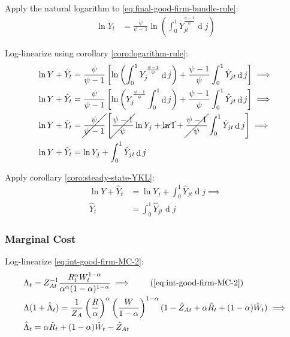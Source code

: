 \documentclass[
	12pt,
	]{article}
\numberwithin{equation}{section}
\DeclareMathOperator{\dif}{d}
\theoremstyle{definition}
\theoremstyle{plain}
\theoremstyle{plain}
\theoremstyle{plain}
\begin{document}
Apply the natural logarithm to \ref{eq:final-good-firm-bundle-rule}:
\begin{align}
	\ln Y_t &= \frac{\psi}{\psi-1} \ln \left( \int_{0}^{1} Y_{jt}^{\frac{\psi-1}{\psi}} \dif j \right) \nonumber
\end{align}

Log-linearize using corollary \ref{coro:logarithm-rule}:
\begin{align}
	\ln Y + \hat{Y}_t &= \frac{\psi}{\psi-1} \left[ \ln \left( \int_{0}^{1} Y_{j}^{\frac{\psi-1}{\psi}} \dif j \right) + \frac{\psi-1}{\psi} \int_{0}^{1} \hat{Y}_{jt} \dif j \right] \implies \nonumber
\\
	\ln Y + \hat{Y}_t &= \frac{\psi}{\psi-1} \left[ \ln \left( Y_{j}^{\frac{\psi-1}{\psi}} \int_{0}^{1} \dif j \right) + \frac{\psi-1}{\psi} \int_{0}^{1} \hat{Y}_{jt} \dif j \right] \implies \nonumber
\\
	\ln Y + \hat{Y}_t &= \cancel{\frac{\psi}{\psi-1}} \left[ \cancel{\frac{\psi-1}{\psi}} \ln Y_{j} + \cancel{\ln1} + \cancel{\frac{\psi-1}{\psi}} \int_{0}^{1} \hat{Y}_{jt} \dif j \right] \implies \nonumber
	\\
	\ln Y + \hat{Y}_t &= \ln Y_{j} + \int_{0}^{1} \hat{Y}_{jt} \dif j \nonumber
\end{align}

Apply corollary \ref{coro:steady-state-YKL}:
\begin{align}
	\ln Y + \hat{Y}_t &= \ln Y_{j} + \int_{0}^{1} \hat{Y}_{jt} \dif j \implies \nonumber \\
	\hat{Y}_t &= \int_{0}^{1} \hat{Y}_{jt} \dif j 
	\label{eq:ll-final-good-firm-bundle-rule}
\end{align}


\subsubsection{Marginal Cost}

Log-linearize \ref{eq:int-good-firm-MC-2}:
\begin{alignat}{2}
	& \Lambda_t = Z_{At}^{-1} \frac{R_t^{\alpha} W_t^{1-\alpha} }{ \alpha^{\alpha} (1-\alpha)^{1-\alpha} } \implies \tag{\ref{eq:int-good-firm-MC-2}} \\
	& \Lambda (1+ \hat{\Lambda}_t) = \frac{1}{Z_{A}} \left( \frac{R}{\alpha} \right)^{\alpha} \left( \frac{W}{1-\alpha} \right)^{1-\alpha} (1- \hat{Z}_{At} + \alpha \hat{R}_t + (1- \alpha) \hat{W}_t ) \implies \nonumber \\
	& \hat{\Lambda}_t = \alpha \hat{R}_t + (1- \alpha) \hat{W}_t - \hat{Z}_{At} \label{eq:ll-int-good-firm-MC-2}
\end{alignat}
\end{document}
